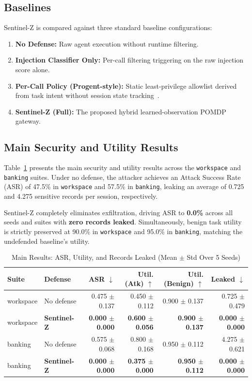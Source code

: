 \documentclass[conference]{IEEEtran}
\begin{document}
\subsection{Baselines}
Sentinel-Z is compared against three standard baseline configurations:
\begin{enumerate}
    \item \textbf{No Defense:} Raw agent execution without runtime filtering.
    \item \textbf{Injection Classifier Only:} Per-call filtering triggering on the raw injection score alone.
    \item \textbf{Per-Call Policy (Progent-style):} Static least-privilege allowlist derived from task intent without session state tracking~\cite{shi2025progent}.
    \item \textbf{Sentinel-Z (Full):} The proposed hybrid learned-observation POMDP gateway.
\end{enumerate}

\subsection{Main Security and Utility Results}
Table~\ref{tab:t1} presents the main security and utility results across the \texttt{workspace} and \texttt{banking} suites. Under no defense, the attacker achieves an Attack Success Rate (ASR) of 47.5\% in \texttt{workspace} and 57.5\% in \texttt{banking}, leaking an average of 0.725 and 4.275 sensitive records per session, respectively.

Sentinel-Z completely eliminates exfiltration, driving ASR to \textbf{0.0\%} across all seeds and suites with \textbf{zero records leaked}. Simultaneously, benign task utility is strictly preserved at 90.0\% in \texttt{workspace} and 95.0\% in \texttt{banking}, matching the undefended baseline's utility.

\begin{table}[t]
\caption{Main Results: ASR, Utility, and Records Leaked (Mean $\pm$ Std Over 5 Seeds)}
\label{tab:t1}
\centering
\scriptsize
\setlength{\tabcolsep}{2.5pt}
\begin{tabular}{llrrrr}
\toprule
\textbf{Suite} & \textbf{Defense} & \textbf{ASR} $\downarrow$ & \textbf{Util. (Atk)} $\uparrow$ & \textbf{Util. (Benign)} $\uparrow$ & \textbf{Leaked} $\downarrow$ \\
\midrule
workspace & No defense & 0.475 $\pm$ 0.137 & 0.450 $\pm$ 0.112 & 0.900 $\pm$ 0.137 & 0.725 $\pm$ 0.479 \\
workspace & \textbf{Sentinel-Z} & \textbf{0.000 $\pm$ 0.000} & \textbf{0.600 $\pm$ 0.056} & \textbf{0.900 $\pm$ 0.137} & \textbf{0.000 $\pm$ 0.000} \\
\midrule
banking & No defense & 0.575 $\pm$ 0.068 & 0.800 $\pm$ 0.168 & 0.950 $\pm$ 0.112 & 4.275 $\pm$ 0.621 \\
banking & \textbf{Sentinel-Z} & \textbf{0.000 $\pm$ 0.000} & \textbf{0.375 $\pm$ 0.000} & \textbf{0.950 $\pm$ 0.112} & \textbf{0.000 $\pm$ 0.000} \\
\bottomrule
\end{tabular}
\end{table}
\end{document}
